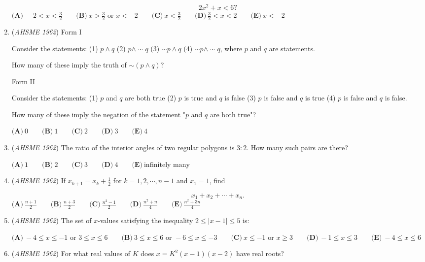 \begin{enumerate}
 \[2x^2 + x < 6?\]
$\textbf{(A)}\ -2 < x < \frac{3}{2} \qquad  \textbf{(B)}\ x > \frac{3}{2} \text{ or } x < -2 \qquad  \textbf{(C)}\ x < \frac{3}{2} \qquad  \textbf{(D)}\ \frac{3}{2} < x < 2 \qquad  \textbf{(E)}\ x < -2$


	\item (\textit{AHSME 1962}) Form I


 Consider the statements: (1) $p \wedge q$ (2) $p \wedge \sim q$ (3) $\sim p \wedge q$ (4) $\sim p \wedge \sim q$, where $p$ and $q$ are statements.


 How many of these imply the truth of $\sim(p \wedge q)$?


 Form II


 Consider the statements: (1) $p$ and $q$ are both true (2) $p$ is true and $q$ is false (3) $p$ is false and $q$ is true (4) $p$ is false and $q$ is false.


 How many of these imply the negation of the statement "$p$ and $q$ are both true"?


 $\textbf{(A)}\ 0 \qquad  \textbf{(B)}\ 1 \qquad  \textbf{(C)}\ 2 \qquad  \textbf{(D)}\ 3 \qquad  \textbf{(E)}\ 4$


	\item (\textit{AHSME 1962}) The ratio of the interior angles of two regular polygons is $3:2$. How many such pairs are there?


 $\textbf{(A)}\ 1 \qquad  \textbf{(B)}\ 2 \qquad  \textbf{(C)}\ 3 \qquad  \textbf{(D)}\ 4 \qquad  \textbf{(E)}\ \text{infinitely many}$


	\item (\textit{AHSME 1962}) If $x_{k+1} = x_k + \frac{1}{2}$ for $k = 1, 2, \cdots, n - 1$ and $x_1 = 1$, find

 \[x_1 + x_2 + \cdots + x_n.\]
$\textbf{(A)}\ \frac{n+1}{2} \qquad  \textbf{(B)}\ \frac{n+3}{2} \qquad  \textbf{(C)}\ \frac{n^2-1}{2} \qquad  \textbf{(D)}\ \frac{n^2+n}{4} \qquad  \textbf{(E)}\ \frac{n^2+3n}{4}$


	\item (\textit{AHSME 1962}) The set of $x$-values satisfying the inequality $2 \leq |x - 1| \leq 5$ is:


 $\textbf{(A)}\ -4 \leq x \leq -1 \text{ or } 3 \leq x \leq 6 \qquad  \textbf{(B)}\ 3 \leq x \leq 6 \text{ or } -6 \leq x \leq -3 \qquad  \textbf{(C)}\ x \leq -1 \text{ or } x \geq 3 \qquad  \textbf{(D)}\ -1 \leq x \leq 3 \qquad  \textbf{(E)}\ -4 \leq x \leq 6$


	\item (\textit{AHSME 1962}) For what real values of $K$ does $x = K^2(x - 1)(x - 2)$ have real roots?



\end{enumerate}
